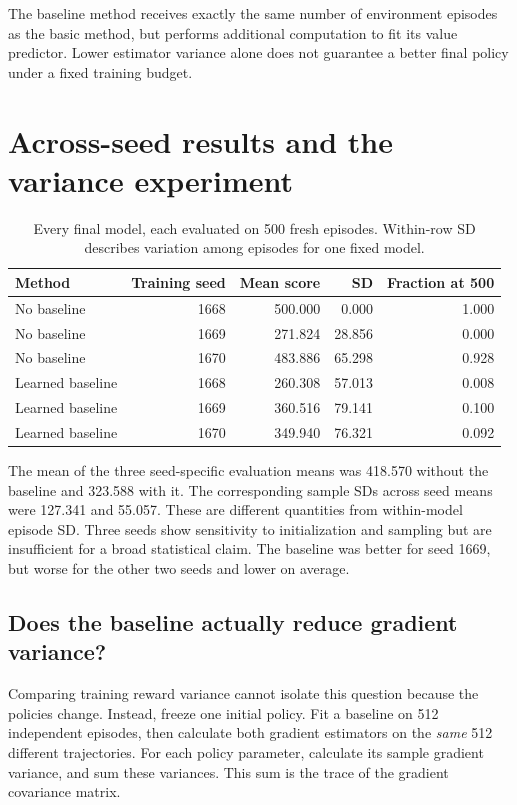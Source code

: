 \documentclass[11pt,letterpaper]{article}
\begin{document}
The baseline method receives exactly the same number of environment episodes as the basic method, but performs additional computation to fit its value predictor. Lower estimator variance alone does not guarantee a better final policy under a fixed training budget.

\clearpage
\section{Across-seed results and the variance experiment}
\begin{table}[!ht]
\centering
\caption{Every final model, each evaluated on 500 fresh episodes. Within-row SD describes variation among episodes for one fixed model.}
\begin{tabular}{lrrrr}
\toprule
Method & Training seed & Mean score & SD & Fraction at 500\\
\midrule
No baseline & 1668 & 500.000 & 0.000 & 1.000\\
No baseline & 1669 & 271.824 & 28.856 & 0.000\\
No baseline & 1670 & 483.886 & 65.298 & 0.928\\
\midrule
Learned baseline & 1668 & 260.308 & 57.013 & 0.008\\
Learned baseline & 1669 & 360.516 & 79.141 & 0.100\\
Learned baseline & 1670 & 349.940 & 76.321 & 0.092\\
\bottomrule
\end{tabular}
\end{table}

The mean of the three seed-specific evaluation means was 418.570 without the baseline and 323.588 with it. The corresponding sample SDs across seed means were 127.341 and 55.057. These are different quantities from within-model episode SD. Three seeds show sensitivity to initialization and sampling but are insufficient for a broad statistical claim. The baseline was better for seed 1669, but worse for the other two seeds and lower on average.

\subsection{Does the baseline actually reduce gradient variance?}
Comparing training reward variance cannot isolate this question because the policies change. Instead, freeze one initial policy. Fit a baseline on 512 independent episodes, then calculate both gradient estimators on the \emph{same} 512 different trajectories. For each policy parameter, calculate its sample gradient variance, and sum these variances. This sum is the trace of the gradient covariance matrix.
\end{document}
